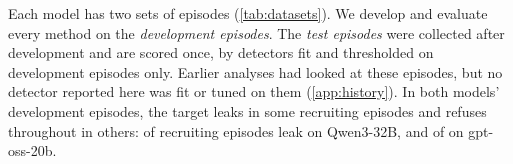 Each model has two sets of episodes (\cref{tab:datasets}).
We develop and evaluate every method on the \emph{development episodes}.
The \emph{test episodes} were collected after development and are scored once, by detectors fit and thresholded on development episodes only.
Earlier analyses had looked at these episodes, but no detector reported here was fit or tuned on them (\cref{app:history}).
In both models' development episodes, the target leaks in some recruiting episodes and refuses throughout in others: \qwenDevLeaks{} of \qwenDevEpisodes{} recruiting episodes leak on Qwen3-32B, and \gptossDevLeaks{} of \gptossDevEpisodes{} on gpt-oss-20b.

\begin{table}[t]
  \centering
  
  \caption{\textbf{The four datasets.} Every main-text number comes from exactly one of them. Columns give recruiting, control and target-alone episodes, scored calls, leaking calls, and episodes excluded before scoring. Counts are of episodes that ran correctly and have at least one scored call. Scored calls are those made after the target has read the secret, up to and including the call that leaks (\cref{app:data}).}
  \label{tab:datasets}
\end{table}

